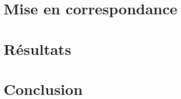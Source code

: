 \documentclass[a4paper]{article}
\begin{document}
\section{Mise en correspondance}


\clearpage

\section{Résultats}

\clearpage


\section{Conclusion}

\clearpage
\end{document}

